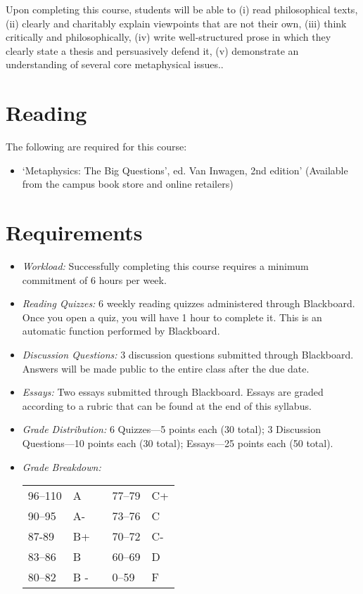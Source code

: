 \documentclass[11pt,article,oneside]{memoir}
\begin{document}
Upon completing this course, students will be able to (i) read
philosophical texts, (ii) clearly and charitably explain viewpoints that
are not their own, (iii) think critically and philosophically, (iv)
write well-structured prose in which they clearly state a thesis and
persuasively defend it, (v) demonstrate an understanding of several core
metaphysical issues..

\section{Reading}

The following are required for this course:

\begin{itemize}
\item
 `Metaphysics: The Big Questions', ed. Van Inwagen, 2nd edition' (Available from the campus book store and online retailers)
\end{itemize}

\section{Requirements}

\begin{itemize}
\item \textit{Workload:} Successfully completing this course requires a minimum commitment of 6 hours per week. 

\item \textit{Reading Quizzes:}  6 weekly reading quizzes administered through Blackboard. Once you open a quiz, you will have
1 hour to complete it. This is an automatic function performed
by Blackboard.
\item \textit{Discussion Questions:} 3 discussion questions submitted through Blackboard. Answers will be made public to the entire class after the due date. 

\item \textit{Essays:} Two essays submitted through Blackboard. Essays are graded according to a rubric that can be found at the end of this syllabus. 

\item \textit{Grade Distribution:} 6 Quizzes---5 points each (30 total); 3 Discussion Questions---10 points each (30 total); Essays---25 points each (50 total).

\item \textit{Grade Breakdown:}

 \begin{tabular}{ | l | l | p{2cm} | l | l | }
    \hline 
96--110 & A  & &  77--79 &  C+ \\  
90--95 & A- & &  73--76 & C \\
87-89 & B+ &  &  70--72 & C- \\ 
83--86 & B  & &  60--69 & D\\
80--82 & B - & & 0--59 & F\\ \hline
    \end{tabular}


\end{itemize}
\end{document}
